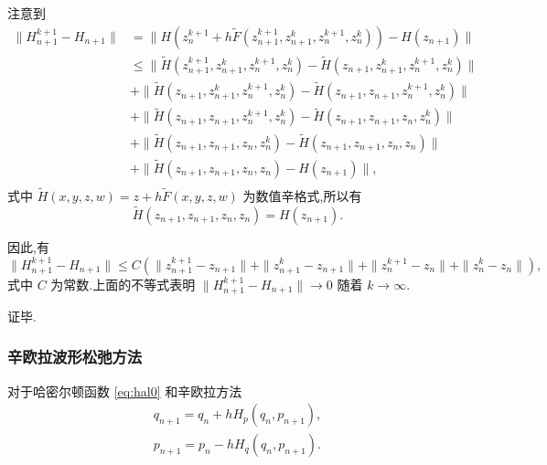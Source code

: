 注意到
\begin{equation*}
\begin{aligned}
\|H^{k+1}_{n+1}-H_{n+1}\|&=\|H(z_{n}^{k+1}+h \tilde{F}(z_{n+1}^{k+1},z_{n+1}^{k},z_{n}^{k+1},z_{n}^{k}))-H(z_{n+1})\|\\
&\le \|\tilde{H}(z_{n+1}^{k+1},z_{n+1}^{k},z_{n}^{k+1},z_{n}^{k})-\tilde{H}(z_{n+1},z_{n+1}^{k},z_{n}^{k+1},z_{n}^{k})\|\\
&+\|\tilde{H}(z_{n+1},z_{n+1}^{k},z_{n}^{k+1},z_{n}^{k})-\tilde{H}(z_{n+1},z_{n+1},z_{n}^{k+1},z_{n}^{k})\|\\
&+\|\tilde{H}(z_{n+1},z_{n+1},z_{n}^{k+1},z_{n}^{k})-\tilde{H}(z_{n+1},z_{n+1},z_{n},z_{n}^{k})\|\\
&+\|\tilde{H}(z_{n+1},z_{n+1},z_{n},z_{n}^{k})-\tilde{H}(z_{n+1},z_{n+1},z_{n},z_{n})\|\\
&+\|\tilde{H}(z_{n+1},z_{n+1},z_{n},z_{n})-H(z_{n+1})\|,\\
\end{aligned}
\end{equation*}
式中 $\tilde{H}(x,y,z,w)=z+h \tilde{F}(x,y,z,w)$ 为数值辛格式,所以有
\begin{equation*}
\tilde{H}(z_{n+1},z_{n+1},z_{n},z_{n})=H(z_{n+1}).
\end{equation*}

因此,有
\begin{equation*}
\|H^{k+1}_{n+1}-H_{n+1}\|\le C(\|z_{n+1}^{k+1}-z_{n+1}\|+ \|z_{n+1}^{k}-z_{n+1}\|+ \|z_{n}^{k+1}-z_{n}\|+ \|z_{n}^{k}-z_{n}\|),
\end{equation*}
式中 $C$ 为常数.上面的不等式表明 $\|H^{k+1}_{n+1}-H_{n+1}\| \to 0$ 随着 $k \to \infty$.

证毕.

\subsubsection{辛欧拉波形松弛方法}
对于哈密尔顿函数 \eqref{eq:hal0} 和辛欧拉方法 \cite{hairer2014challenges}
\begin{equation}\label{eq:symeuler1}
  \begin{array}{c}
    q_{n+1}=q_{n}+hH_{p}(q_{n},p_{n+1}),\\
    p_{n+1}=p_{n}-hH_{q}(q_{n},p_{n+1}).
  \end{array}
\end{equation}

